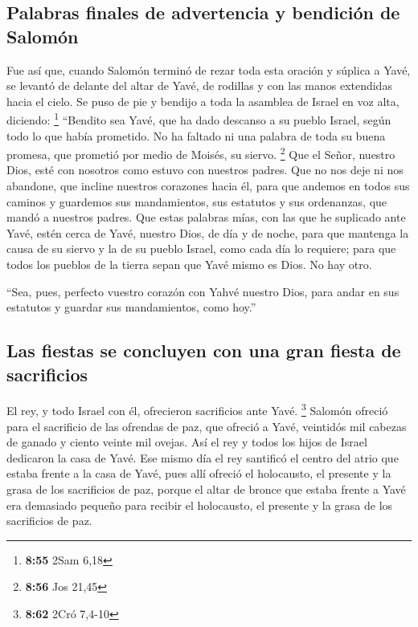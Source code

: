 \hypertarget{palabras-finales-de-advertencia-y-bendiciuxf3n-de-salomuxf3n}{%
\subsection{Palabras finales de advertencia y bendición de
Salomón}\label{palabras-finales-de-advertencia-y-bendiciuxf3n-de-salomuxf3n}}

 Fue así que, cuando Salomón terminó de rezar toda esta
oración y súplica a Yavé, se levantó de delante del altar de Yavé, de
rodillas y con las manos extendidas hacia el cielo.  Se
puso de pie y bendijo a toda la asamblea de Israel en voz alta,
diciendo: \footnote{\textbf{8:55} 2Sam 6,18}  ``Bendito
sea Yavé, que ha dado descanso a su pueblo Israel, según todo lo que
había prometido. No ha faltado ni una palabra de toda su buena promesa,
que prometió por medio de Moisés, su siervo. \footnote{\textbf{8:56} Jos
  21,45}  Que el Señor, nuestro Dios, esté con nosotros
como estuvo con nuestros padres. Que no nos deje ni nos abandone,
 que incline nuestros corazones hacia él, para que
andemos en todos sus caminos y guardemos sus mandamientos, sus estatutos
y sus ordenanzas, que mandó a nuestros padres.  Que estas
palabras mías, con las que he suplicado ante Yavé, estén cerca de Yavé,
nuestro Dios, de día y de noche, para que mantenga la causa de su siervo
y la de su pueblo Israel, como cada día lo requiere; 
para que todos los pueblos de la tierra sepan que Yavé mismo es Dios. No
hay otro.

 ``Sea, pues, perfecto vuestro corazón con Yahvé nuestro
Dios, para andar en sus estatutos y guardar sus mandamientos, como
hoy.''

\hypertarget{las-fiestas-se-concluyen-con-una-gran-fiesta-de-sacrificios}{%
\subsection{Las fiestas se concluyen con una gran fiesta de
sacrificios}\label{las-fiestas-se-concluyen-con-una-gran-fiesta-de-sacrificios}}

 El rey, y todo Israel con él, ofrecieron sacrificios
ante Yavé. \footnote{\textbf{8:62} 2Cró 7,4-10}  Salomón
ofreció para el sacrificio de las ofrendas de paz, que ofreció a Yavé,
veintidós mil cabezas de ganado y ciento veinte mil ovejas. Así el rey y
todos los hijos de Israel dedicaron la casa de Yavé.  Ese
mismo día el rey santificó el centro del atrio que estaba frente a la
casa de Yavé, pues allí ofreció el holocausto, el presente y la grasa de
los sacrificios de paz, porque el altar de bronce que estaba frente a
Yavé era demasiado pequeño para recibir el holocausto, el presente y la
grasa de los sacrificios de paz.

